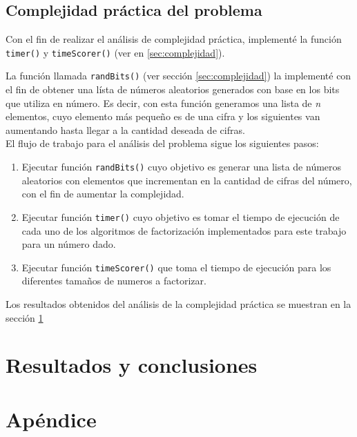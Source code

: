 \documentclass{article}
\begin{document}
\subsection{Complejidad práctica del problema}

Con el fin de realizar el análisis de complejidad práctica, implementé la
función \texttt{timer()} y \texttt{timeScorer()} (ver en \ref{sec:complejidad}).

La función llamada \texttt{randBits()} (ver sección \ref{sec:complejidad}) la
implementé con el fin de obtener una lísta de números aleatorios generados con
base en los bits que utiliza en número. Es decir, con esta función generamos una
lista de \textit{n} elementos, cuyo elemento más pequeño es de una cifra y los
siguientes van aumentando hasta llegar a la cantidad deseada de cifras.\\

El flujo de trabajo para el análisis del problema sigue los siguientes pasos:

\begin{enumerate}

\item Ejecutar función \texttt{randBits()} cuyo objetivo es generar una lista de
números aleatorios con elementos que incrementan en la cantidad de cifras del
número, con el fin de aumentar la complejidad.
\item Ejecutar función \texttt{timer()} cuyo objetivo es tomar el tiempo de
ejecución de cada uno de los algoritmos de factorización implementados para este
trabajo para un número dado.
\item Ejecutar función \texttt{timeScorer()} que toma el tiempo de ejecución
para los diferentes tamaños de numeros a factorizar.
\end{enumerate}
    

Los resultados obtenidos del análisis de la complejidad práctica se muestran en
la sección \ref{sec:resultados}


\section{Resultados y conclusiones} \label{sec:resultados}



 


\pagebreak
\section{Apéndice}
\end{document}
